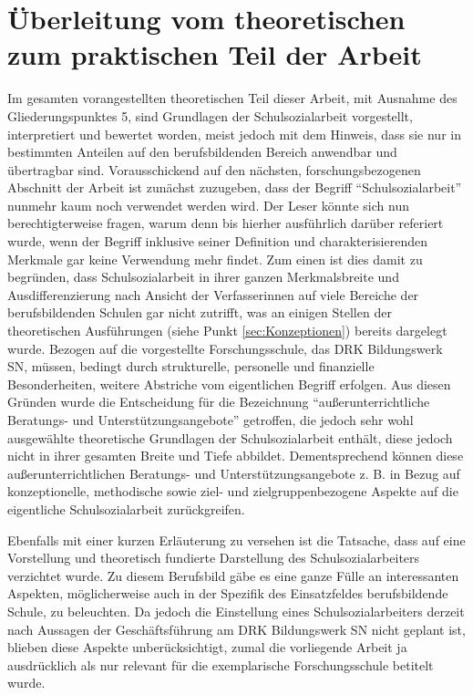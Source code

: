\section{Überleitung vom theoretischen zum praktischen Teil der Arbeit}
\label{sec:ÜberleitungVomTheoretischenZumPraktischenTeilDerArbeit}

Im gesamten vorangestellten theoretischen Teil dieser Arbeit, mit Ausnahme des Gliederungspunktes 5, sind Grundlagen der Schulsozialarbeit vorgestellt, interpretiert und bewertet worden, meist jedoch mit dem Hinweis, dass sie nur in bestimmten Anteilen auf den berufsbildenden Bereich anwendbar und übertragbar sind. Vorausschickend auf den nächsten, forschungsbezogenen Abschnitt der Arbeit ist zunächst zuzugeben, dass der Begriff "`Schulsozialarbeit"' nunmehr kaum noch verwendet werden wird. Der Leser könnte sich nun berechtigterweise fragen, warum denn bis hierher ausführlich darüber referiert wurde, wenn der Begriff inklusive seiner Definition und charakterisierenden Merkmale gar keine Verwendung mehr findet. Zum einen ist dies damit zu begründen, dass Schulsozialarbeit in ihrer ganzen Merkmalsbreite und Ausdifferenzierung nach Ansicht der Verfasserinnen auf viele Bereiche der berufsbildenden Schulen gar nicht zutrifft, was an einigen Stellen der theoretischen Ausführungen (siehe Punkt \ref{sec:Konzeptionen}) bereits dargelegt wurde. Bezogen auf die vorgestellte Forschungsschule, das DRK Bildungswerk SN, müssen, bedingt durch strukturelle, personelle und finanzielle Besonderheiten, weitere Abstriche vom eigentlichen Begriff erfolgen. Aus diesen Gründen wurde die Entscheidung für die Bezeichnung "`außerunterrichtliche Beratungs- und Unterstützungsangebote"' getroffen, die jedoch sehr wohl ausgewählte theoretische Grundlagen der Schulsozialarbeit enthält, diese jedoch nicht in ihrer gesamten Breite und Tiefe abbildet. Dementsprechend können diese außerunterrichtlichen Beratungs- und Unterstützungsangebote z. B. in Bezug auf konzeptionelle, methodische sowie ziel- und zielgruppenbezogene Aspekte auf die eigentliche Schulsozialarbeit zurückgreifen. 

Ebenfalls mit einer kurzen Erläuterung zu versehen ist die Tatsache, dass auf eine Vorstellung und theoretisch fundierte Darstellung des Schulsozialarbeiters verzichtet wurde. Zu diesem Berufsbild gäbe es eine ganze Fülle an interessanten Aspekten, möglicherweise auch in der Spezifik des Einsatzfeldes berufsbildende Schule, zu beleuchten. Da jedoch die Einstellung eines Schulsozialarbeiters derzeit nach Aussagen der Geschäftsführung am DRK Bildungswerk SN nicht geplant ist, blieben diese Aspekte unberücksichtigt, zumal die vorliegende Arbeit ja ausdrücklich als nur relevant für die exemplarische Forschungsschule betitelt wurde.

